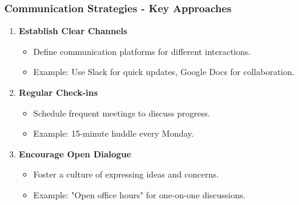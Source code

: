 \documentclass[aspectratio=169]{beamer}
\begin{document}
\begin{frame}[fragile]
    \frametitle{Communication Strategies - Key Approaches}
    \begin{enumerate}
        \item \textbf{Establish Clear Channels}
            \begin{itemize}
                \item Define communication platforms for different interactions. 
                \item Example: Use Slack for quick updates, Google Docs for collaboration.
            \end{itemize}

        \item \textbf{Regular Check-ins}
            \begin{itemize}
                \item Schedule frequent meetings to discuss progress.
                \item Example: 15-minute huddle every Monday.
            \end{itemize}

        \item \textbf{Encourage Open Dialogue}
            \begin{itemize}
                \item Foster a culture of expressing ideas and concerns.
                \item Example: "Open office hours" for one-on-one discussions.
            \end{itemize}
    \end{enumerate}
\end{frame}
\end{document}

